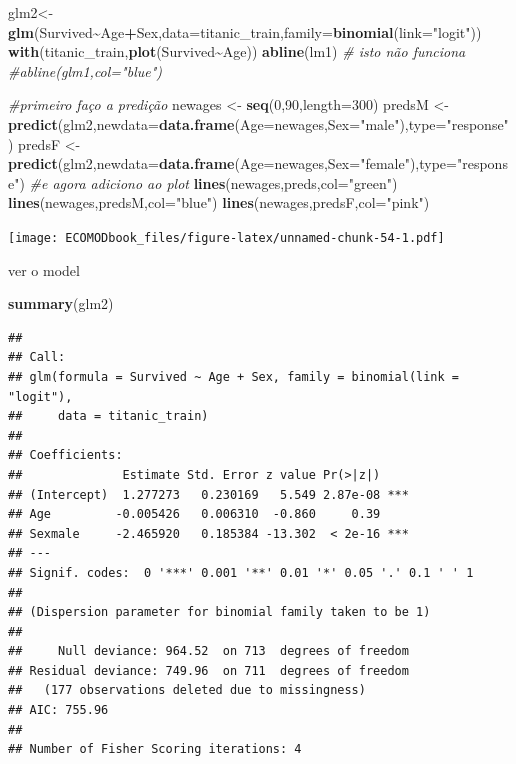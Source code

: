 \documentclass[
]{book}
\newenvironment{Shaded}{\begin{snugshade}}{\end{snugshade}}
\newcommand{\AttributeTok}[1]{\textcolor[rgb]{0.13,0.29,0.53}{#1}}
\newcommand{\CommentTok}[1]{\textcolor[rgb]{0.56,0.35,0.01}{\textit{#1}}}
\newcommand{\DecValTok}[1]{\textcolor[rgb]{0.00,0.00,0.81}{#1}}
\newcommand{\FunctionTok}[1]{\textcolor[rgb]{0.13,0.29,0.53}{\textbf{#1}}}
\newcommand{\NormalTok}[1]{#1}
\newcommand{\OtherTok}[1]{\textcolor[rgb]{0.56,0.35,0.01}{#1}}
\newcommand{\SpecialCharTok}[1]{\textcolor[rgb]{0.81,0.36,0.00}{\textbf{#1}}}
\newcommand{\StringTok}[1]{\textcolor[rgb]{0.31,0.60,0.02}{#1}}
\begin{document}
\begin{Shaded}
\begin{Highlighting}[]
\NormalTok{glm2}\OtherTok{\textless{}{-}}\FunctionTok{glm}\NormalTok{(Survived}\SpecialCharTok{\textasciitilde{}}\NormalTok{Age}\SpecialCharTok{+}\NormalTok{Sex,}\AttributeTok{data=}\NormalTok{titanic\_train,}\AttributeTok{family=}\FunctionTok{binomial}\NormalTok{(}\AttributeTok{link=}\StringTok{"logit"}\NormalTok{))}
\FunctionTok{with}\NormalTok{(titanic\_train,}\FunctionTok{plot}\NormalTok{(Survived}\SpecialCharTok{\textasciitilde{}}\NormalTok{Age))}
\FunctionTok{abline}\NormalTok{(lm1)}
\CommentTok{\# isto não funciona}
\CommentTok{\#abline(glm1,col="blue")}

\CommentTok{\#primeiro faço a predição}
\NormalTok{newages }\OtherTok{\textless{}{-}} \FunctionTok{seq}\NormalTok{(}\DecValTok{0}\NormalTok{,}\DecValTok{90}\NormalTok{,}\AttributeTok{length=}\DecValTok{300}\NormalTok{)}
\NormalTok{predsM }\OtherTok{\textless{}{-}} \FunctionTok{predict}\NormalTok{(glm2,}\AttributeTok{newdata=}\FunctionTok{data.frame}\NormalTok{(}\AttributeTok{Age=}\NormalTok{newages,}\AttributeTok{Sex=}\StringTok{"male"}\NormalTok{),}\AttributeTok{type=}\StringTok{"response"}\NormalTok{)}
\NormalTok{predsF }\OtherTok{\textless{}{-}} \FunctionTok{predict}\NormalTok{(glm2,}\AttributeTok{newdata=}\FunctionTok{data.frame}\NormalTok{(}\AttributeTok{Age=}\NormalTok{newages,}\AttributeTok{Sex=}\StringTok{"female"}\NormalTok{),}\AttributeTok{type=}\StringTok{"response"}\NormalTok{)}
\CommentTok{\#e agora adiciono ao plot}
\FunctionTok{lines}\NormalTok{(newages,preds,}\AttributeTok{col=}\StringTok{"green"}\NormalTok{)}
\FunctionTok{lines}\NormalTok{(newages,predsM,}\AttributeTok{col=}\StringTok{"blue"}\NormalTok{)}
\FunctionTok{lines}\NormalTok{(newages,predsF,}\AttributeTok{col=}\StringTok{"pink"}\NormalTok{)}
\end{Highlighting}
\end{Shaded}

\texttt{[image: ECOMODbook\_files/figure-latex/unnamed-chunk-54-1.pdf]}

ver o model

\begin{Shaded}
\begin{Highlighting}[]
\FunctionTok{summary}\NormalTok{(glm2)}
\end{Highlighting}
\end{Shaded}

\begin{verbatim}
## 
## Call:
## glm(formula = Survived ~ Age + Sex, family = binomial(link = "logit"), 
##     data = titanic_train)
## 
## Coefficients:
##              Estimate Std. Error z value Pr(>|z|)    
## (Intercept)  1.277273   0.230169   5.549 2.87e-08 ***
## Age         -0.005426   0.006310  -0.860     0.39    
## Sexmale     -2.465920   0.185384 -13.302  < 2e-16 ***
## ---
## Signif. codes:  0 '***' 0.001 '**' 0.01 '*' 0.05 '.' 0.1 ' ' 1
## 
## (Dispersion parameter for binomial family taken to be 1)
## 
##     Null deviance: 964.52  on 713  degrees of freedom
## Residual deviance: 749.96  on 711  degrees of freedom
##   (177 observations deleted due to missingness)
## AIC: 755.96
## 
## Number of Fisher Scoring iterations: 4
\end{verbatim}
\end{document}

